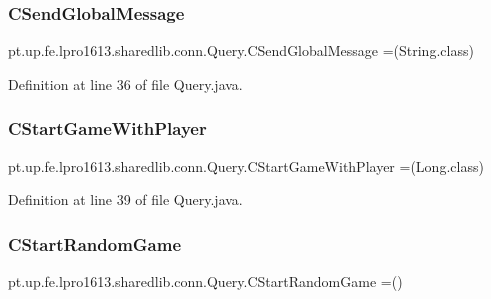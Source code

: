 \subsubsection{\texorpdfstring{C\+Send\+Global\+Message}{CSendGlobalMessage}}
{\footnotesize\ttfamily pt.\+up.\+fe.\+lpro1613.\+sharedlib.\+conn.\+Query.\+C\+Send\+Global\+Message =(String.\+class)}



Definition at line 36 of file Query.\+java.

\hypertarget{enumpt_1_1up_1_1fe_1_1lpro1613_1_1sharedlib_1_1conn_1_1_query_a4e8ad00082033bfe9dc8a17424de7a04}{}\label{enumpt_1_1up_1_1fe_1_1lpro1613_1_1sharedlib_1_1conn_1_1_query_a4e8ad00082033bfe9dc8a17424de7a04} 
\subsubsection{\texorpdfstring{C\+Start\+Game\+With\+Player}{CStartGameWithPlayer}}
{\footnotesize\ttfamily pt.\+up.\+fe.\+lpro1613.\+sharedlib.\+conn.\+Query.\+C\+Start\+Game\+With\+Player =(Long.\+class)}



Definition at line 39 of file Query.\+java.

\hypertarget{enumpt_1_1up_1_1fe_1_1lpro1613_1_1sharedlib_1_1conn_1_1_query_a95b2061a9c70c464a4e75dc4cb3e600e}{}\label{enumpt_1_1up_1_1fe_1_1lpro1613_1_1sharedlib_1_1conn_1_1_query_a95b2061a9c70c464a4e75dc4cb3e600e} 
\subsubsection{\texorpdfstring{C\+Start\+Random\+Game}{CStartRandomGame}}
{\footnotesize\ttfamily pt.\+up.\+fe.\+lpro1613.\+sharedlib.\+conn.\+Query.\+C\+Start\+Random\+Game =()}



